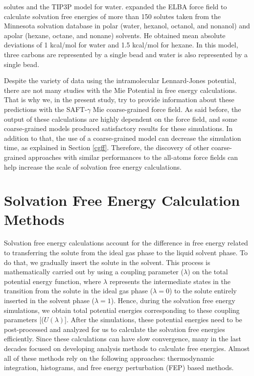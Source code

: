 solutes and the TIP3P model for water.  expanded the ELBA force field to calculate solvation free energies of more than 150 solutes taken from the Minnesota solvation
database in polar (water, hexanol, octanol, and nonanol) and apolar (hexane, octane, and nonane) solvents. He obtained mean absolute deviations of 1 kcal/mol for water and 1.5 kcal/mol for hexane. In this model, three carbons are represented by a single bead and water is also represented by a single bead. 

Despite the variety of data using the intramolecular Lennard-Jones potential, there are not many studies with the Mie Potential in free energy calculations. That is why we, in the present study, try to provide information about these predictions with the SAFT-$\gamma$ Mie coarse-grained force field.  As said before, the output of these calculations are highly dependent on the force field, and some coarse-grained models produced satisfactory results for these simulations. In addition to that, the use of a coarse-grained model can decrease the simulation time, as explained in Section \ref{cgff}. Therefore, the discovery of other coarse-grained approaches with similar performances to the all-atoms force fields can help increase the scale of solvation free energy calculations. 

\section{Solvation Free Energy Calculation Methods}\label{SFECM}

Solvation free energy calculations account for the difference in free energy related to transferring the solute from the ideal gas phase to the liquid solvent phase. To do that, we gradually insert the solute in the solvent. This process is mathematically carried out by using a coupling parameter ($\lambda$) on the total potential energy function, where $\lambda$ represents the intermediate states in the transition from the solute in the ideal gas phase ($\lambda=0$) to the solute entirely inserted in the solvent phase ($\lambda = 1$). Hence,  during the solvation free energy simulations, we obtain total potential energies corresponding to these coupling parameters [($U(\lambda)$]. After the simulations, these potential energies need to be post-processed and analyzed for us to calculate the solvation free energies efficiently. Since these calculations can have slow convergence, many in the last decades focused on developing analysis methods to calculate free energies. Almost all of these methods rely on the following approaches:   thermodynamic integration, histograms, and free energy perturbation (FEP) based methods.

